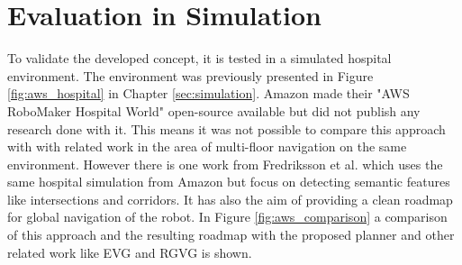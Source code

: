 \section{Evaluation in Simulation}
\label{sec:evaluation_simulation}
To validate the developed concept, it is tested in a simulated hospital environment. The environment was previously presented in Figure \ref{fig:aws_hospital} in Chapter \ref{sec:simulation}. Amazon made their "AWS RoboMaker Hospital World" \cite{aws_robotics_aws_2023} open-source available but did not publish any research done with it. This means it was not possible to compare this approach with with related work in the area of multi-floor navigation on the same environment. However there is one work from Fredriksson et al. \cite{fredriksson_semantic_2023} which uses the same hospital simulation from Amazon but focus on detecting semantic features like intersections and corridors. It has also the aim of providing a clean roadmap for global navigation of the robot. In Figure \ref{fig:aws_comparison} a comparison of this approach and the resulting roadmap with the proposed planner and other related work like EVG and RGVG is shown.

